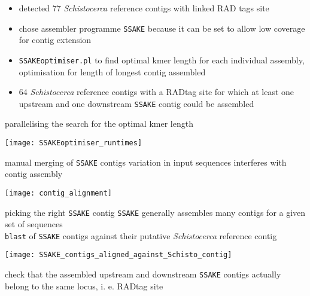 \documentclass[xcolor=pdftex, dvipsnames, table]{beamer}
\begin{document}
\begin{frame}{}
\begin{itemize}
\item detected 77 \textit{Schistocerca} reference contigs with linked RAD tags site \pause \vskip10pt
\item chose assembler programme \texttt{SSAKE} because it can be set to allow low coverage for contig extension \pause \vskip10pt
\item \texttt{SSAKEoptimiser.pl} to find optimal kmer length for each individual assembly, optimisation for length of longest contig assembled \pause \vskip10pt
\item 64 \textit{Schistocerca} reference contigs with a RADtag site for which at least one upstream and one downstream \texttt{SSAKE} contig could be assembled
\end{itemize}
\end{frame}

\begin{frame}{parallelising the search for the optimal kmer length}
\begin{center}
\vskip -20pt
\texttt{[image: SSAKEoptimiser\_runtimes]}
\end{center}
\end{frame}

\begin{frame}{manual merging of \texttt{SSAKE} contigs}
variation in input sequences interferes with contig assembly\\ \vskip 15pt
\begin{center}
\texttt{[image: contig\_alignment]}
\end{center}
\end{frame}

\begin{frame}{picking the right \texttt{SSAKE} contig}
\footnotesize
\texttt{SSAKE} generally assembles many contigs for a given set of sequences\\ \vskip15pt
\texttt{blast} of \texttt{SSAKE} contigs against their putative \textit{Schistocerca} reference contig\\ \vskip15pt
\begin{center}
\texttt{[image: SSAKE\_contigs\_aligned\_against\_Schisto\_contig]}
\end{center}
check that the assembled upstream and downstream \texttt{SSAKE} contigs actually belong to the same locus, i. e. RADtag site
\end{frame}
\end{document}
